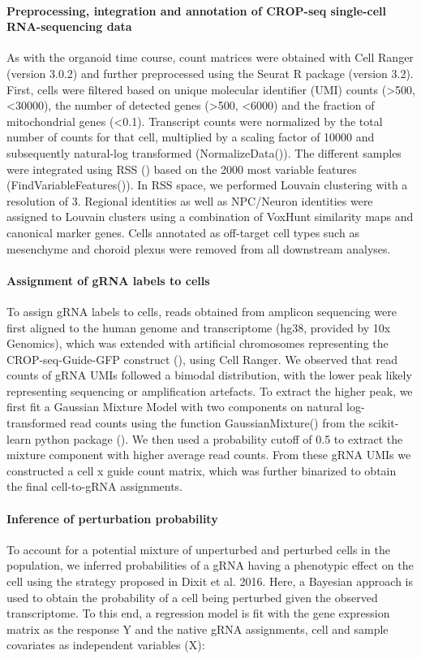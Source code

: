 \paragraph{Preprocessing, integration and annotation of CROP-seq single-cell RNA-sequencing data}
As with the organoid time course, count matrices were obtained with Cell Ranger (version 3.0.2) and further preprocessed using the Seurat R package (version 3.2). First, cells were filtered based on unique molecular identifier (UMI) counts (>500, <30000), the number of detected genes (>500, <6000) and the fraction of mitochondrial genes (<0.1). Transcript counts were normalized by the total number of counts for that cell, multiplied by a scaling factor of 10000 and subsequently natural-log transformed (NormalizeData()). The different samples were integrated using RSS (\cite{he_css_2020}) based on the 2000 most variable features (FindVariableFeatures()). In RSS space, we performed Louvain clustering with a resolution of 3. Regional identities as well as NPC/Neuron identities were assigned to Louvain clusters using a combination of VoxHunt similarity maps and canonical marker genes. Cells annotated as off-target cell types such as mesenchyme and choroid plexus were removed from all downstream analyses.
 
\paragraph{Assignment of gRNA labels to cells}
To assign gRNA labels to cells, reads obtained from amplicon sequencing were first aligned to the human genome and transcriptome (hg38, provided by 10x Genomics), which was extended with artificial chromosomes representing the CROP-seq-Guide-GFP construct (\cite{datlinger_pooled_2017}), using Cell Ranger. We observed that read counts of gRNA UMIs followed a bimodal distribution, with the lower peak likely representing sequencing or amplification artefacts. To extract the higher peak, we first fit a Gaussian Mixture Model with two components on natural log-transformed read counts using the function GaussianMixture() from the scikit-learn python package (\cite{garreta_learning_2013}). We then used a probability cutoff of 0.5 to extract the mixture component with higher average read counts. From these gRNA UMIs we constructed a cell x guide count matrix, which was further binarized to obtain the final cell-to-gRNA assignments.
 
\paragraph{Inference of perturbation probability}
To account for a potential mixture of unperturbed and perturbed cells in the population, we inferred probabilities of a gRNA having a phenotypic effect on the cell using the strategy proposed in Dixit et al. 2016. Here, a Bayesian approach is used to obtain the probability of a cell being perturbed given the observed transcriptome. To this end, a regression model is fit with the gene expression matrix as the response Y and the native gRNA assignments, cell and sample covariates as independent variables (X):
 
